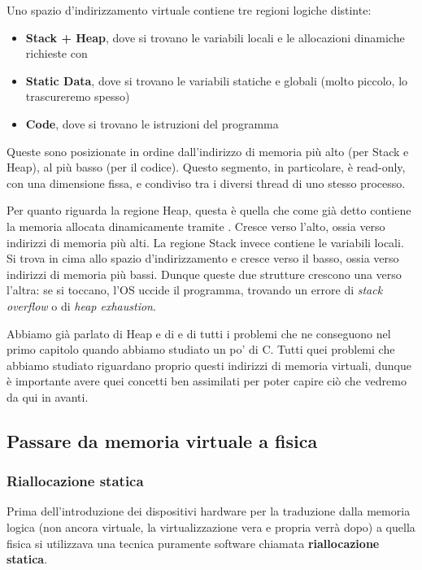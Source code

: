 \documentclass[11pt, a4paper, titlepage, oneside]{scrbook}
\begin{document}
Uno spazio d'indirizzamento virtuale contiene tre regioni logiche distinte:
\begin{itemize}
    \item \textbf{Stack + Heap}, dove si trovano le variabili locali e le allocazioni dinamiche richieste con 
    \item \textbf{Static Data}, dove si trovano le variabili statiche e globali (molto piccolo, lo trascureremo spesso)
    \item \textbf{Code}, dove si trovano le istruzioni del programma
\end{itemize}

Queste sono posizionate in ordine dall'indirizzo di memoria più alto (per Stack e Heap), al più basso (per il codice). Questo segmento, in particolare, è read-only, con una dimensione fissa, e condiviso tra i diversi thread di uno stesso processo.

Per quanto riguarda la regione Heap, questa è quella che come già detto contiene la memoria allocata dinamicamente tramite . Cresce verso l'alto, ossia verso indirizzi di memoria più alti. La regione Stack invece contiene le variabili locali. Si trova in cima allo spazio d'indirizzamento e cresce verso il basso, ossia verso indirizzi di memoria più bassi. Dunque queste due strutture crescono una verso l'altra: se si toccano, l'OS uccide il programma, trovando un errore di \textit{stack overflow} o di \textit{heap exhaustion}. 

Abbiamo già parlato di Heap e di  e di tutti i problemi che ne conseguono nel primo capitolo quando abbiamo studiato un po' di C. Tutti quei problemi che abbiamo studiato riguardano proprio questi indirizzi di memoria virtuali, dunque è importante avere quei concetti ben assimilati per poter capire ciò che vedremo da qui in avanti.

\subsection{Passare da memoria virtuale a fisica}

\subsubsection*{Riallocazione statica}

Prima dell'introduzione dei dispositivi hardware per la traduzione dalla memoria logica (non ancora virtuale, la virtualizzazione vera e propria verrà dopo) a quella fisica si utilizzava una tecnica puramente software chiamata \textbf{riallocazione statica}. 
\end{document}
